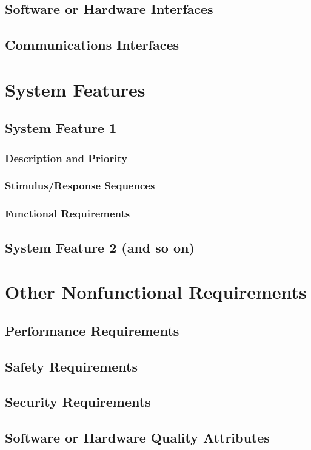\documentclass[english]{article}
\numberwithin{equation}{section} %
\begin{document}
\subsection{Software or Hardware Interfaces}
\subsection{Communications Interfaces}

\newpage
\section{System Features}
\subsection{System Feature 1}
\subsubsection{Description and Priority}
\subsubsection{Stimulus/Response Sequences}
\subsubsection{Functional Requirements}
\subsection{System Feature 2 (and so on)}

\newpage
\section{Other Nonfunctional Requirements}
\subsection{Performance Requirements}
\subsection{Safety Requirements}
\subsection{Security Requirements}
\subsection{Software or Hardware Quality Attributes}
\end{document}
